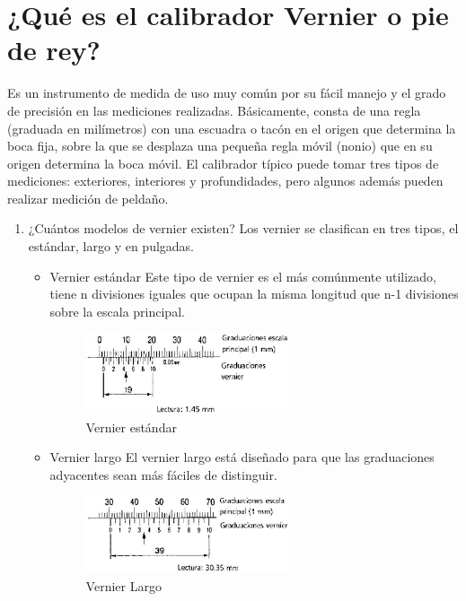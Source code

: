 \documentclass{article}
\theoremstyle{mytheoremstyle}
\theoremstyle{mytheoremstyle}
\theoremstyle{myproblemstyle}
\begin{document}
\section{¿Qué es el calibrador Vernier o pie de rey?}
Es un instrumento de medida de uso muy común por su fácil manejo y el grado de precisión en las mediciones realizadas. Básicamente, consta de una regla (graduada en milímetros) con una escuadra o tacón en el origen que determina la boca fija, sobre la que se desplaza
una pequeña regla móvil (nonio) que en su origen determina la boca móvil. El calibrador típico puede tomar tres tipos de mediciones: exteriores,
interiores y profundidades, pero algunos además pueden realizar medición de peldaño.
\begin{enumerate}
\item ¿Cuántos modelos de vernier existen?\newline
Los vernier se clasifican en tres tipos, el estándar, largo y en pulgadas.
\begin{itemize}
\item Vernier estándar \newline
Este tipo de vernier es el más comúnmente utilizado, tiene n divisiones iguales
que ocupan la misma longitud que n-1 divisiones sobre la escala principal.
\begin{figure}[H]
	\centering
	\includegraphics[width=0.6\textwidth]{lectura_vernier.png}
	\caption{Vernier estándar}
	\label{fig:imagen2}
\end{figure}
\end{itemize}

\begin{itemize}
	\item Vernier largo \newline
	      El vernier largo está diseñado para que las graduaciones adyacentes sean más
	      fáciles de distinguir.
	      \begin{figure}[H]
		      \centering
		      \includegraphics[width=0.6\textwidth]{lectura2.png}
		      \caption{Vernier Largo}
		      \label{fig:imagen2}
	      \end{figure}
		\end{itemize}


\end{enumerate}
\end{document}
